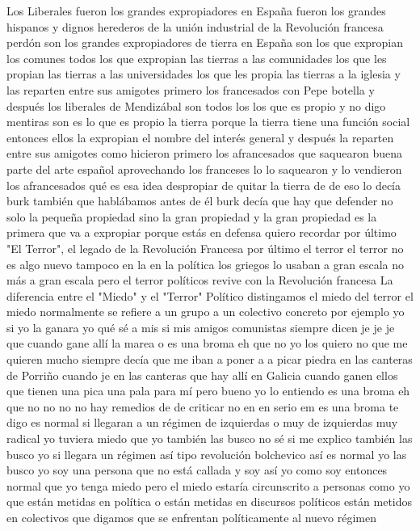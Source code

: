 Los Liberales fueron los grandes expropiadores en España
fueron los grandes hispanos y dignos herederos de la unión industrial de la Revolución francesa perdón son los grandes expropiadores de tierra
en España son los que expropian los comunes todos los que expropian las tierras a las comunidades los que les propian las tierras a las universidades
los que les propia las tierras a la iglesia y las reparten entre sus amigotes primero los francesados
con Pepe botella y después los liberales de Mendizábal son todos los los que es propio y no digo mentiras
son es lo que es propio la tierra porque la tierra tiene una función social entonces ellos la expropian el nombre del interés general
y después la reparten entre sus amigotes como hicieron primero los afrancesados que saquearon buena parte del arte español
aprovechando los franceses lo lo saquearon y lo vendieron los afrancesados
qué es esa idea despropiar de quitar la tierra de de eso lo decía burk
también que hablábamos antes de él burk decía que hay que defender no solo la pequeña propiedad sino la gran propiedad
y la gran propiedad es la primera que va a expropiar porque estás en defensa quiero recordar por último
"El Terror", el legado de la Revolución Francesa
por último el terror
el terror no es algo nuevo tampoco en la en la política los griegos lo usaban a gran escala
no más a gran escala pero el terror políticos revive con la Revolución francesa
La diferencia entre el "Miedo" y el "Terror" Político
distingamos el miedo del terror el miedo normalmente se refiere a un grupo a un colectivo concreto por ejemplo yo
si yo la ganara yo qué sé a mis si mis amigos comunistas siempre dicen je je je
que cuando gane allí la marea o es una broma eh que no yo los quiero no que me quieren mucho siempre decía que me iban a poner a a picar piedra
en las canteras de Porriño cuando je en las canteras que hay allí en Galicia cuando ganen ellos que tienen una pica
una pala para mí pero bueno yo lo entiendo es una broma eh que no no
no no hay remedios de de criticar no en en serio em es una broma te digo
es normal si llegaran a un régimen de izquierdas o muy de izquierdas muy radical yo tuviera miedo
que yo también las busco no sé si me explico también las busco yo
si llegara un régimen así tipo revolución bolchevico así es normal yo las busco yo soy una persona que no está callada
y soy así yo como soy entonces normal que yo tenga miedo pero el miedo estaría circunscrito a personas como yo
que están metidas en política o están metidas en discursos políticos están metidos en colectivos que digamos que se enfrentan políticamente al nuevo régimen
